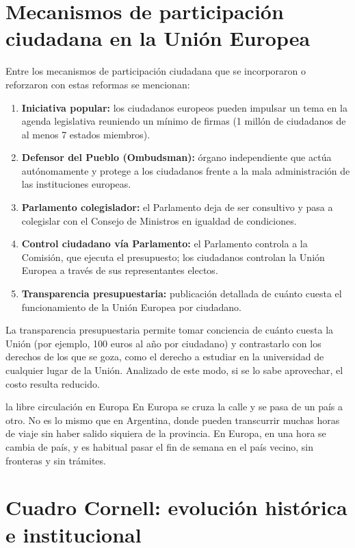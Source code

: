 \documentclass[12pt,oneside]{book}
\begin{document}
\section{Mecanismos de participación ciudadana en la Unión Europea}

Entre los mecanismos de participación ciudadana que se incorporaron o reforzaron con estas reformas se mencionan:

\begin{enumerate}
    \item \textbf{Iniciativa popular:} los ciudadanos europeos pueden impulsar un tema en la agenda legislativa reuniendo un mínimo de firmas (1 millón de ciudadanos de al menos 7 estados miembros).
    \item \textbf{Defensor del Pueblo (Ombudsman):} órgano independiente que actúa autónomamente y protege a los ciudadanos frente a la mala administración de las instituciones europeas.
    \item \textbf{Parlamento colegislador:} el Parlamento deja de ser consultivo y pasa a colegislar con el Consejo de Ministros en igualdad de condiciones.
    \item \textbf{Control ciudadano vía Parlamento:} el Parlamento controla a la Comisión, que ejecuta el presupuesto; los ciudadanos controlan la Unión Europea a través de sus representantes electos.
    \item \textbf{Transparencia presupuestaria:} publicación detallada de cuánto cuesta el funcionamiento de la Unión Europea por ciudadano.
\end{enumerate}

La transparencia presupuestaria permite tomar conciencia de cuánto cuesta la Unión (por ejemplo, 100 euros al año por ciudadano) y contrastarlo con los derechos de los que se goza, como el derecho a estudiar en la universidad de cualquier lugar de la Unión. Analizado de este modo, si se lo sabe aprovechar, el costo resulta reducido.

\begin{example}{la libre circulación en Europa}
En Europa se cruza la calle y se pasa de un país a otro. No es lo mismo que en Argentina, donde pueden transcurrir muchas horas de viaje sin haber salido siquiera de la provincia. En Europa, en una hora se cambia de país, y es habitual pasar el fin de semana en el país vecino, sin fronteras y sin trámites.
\end{example}

\section{Cuadro Cornell: evolución histórica e institucional}
\end{document}
